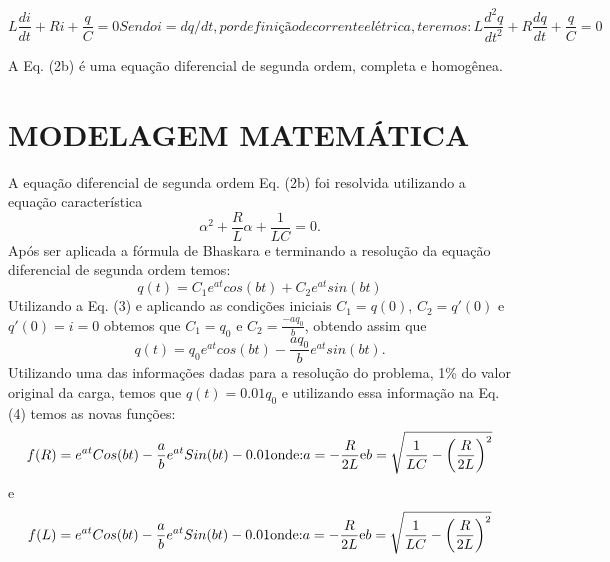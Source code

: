 \documentclass[12pt,fleqn]{article}
\begin{document}
\begin{subequations}
\label{eqn:total}
\begin{equation}
\label{eqn:parcial}
L\frac{di}{dt}+Ri+\frac{q}{C}=0
\end{equation}

Sendo i = dq/dt, por definição de corrente elétrica, teremos:

\begin{equation}
L\frac{d^{2}q}{dt^{2}} +R\frac{dq}{dt}+\frac{q}{C}=0
\label{eqn:parcia1}
\end{equation}
\end{subequations}

A Eq. (2b) é uma equação diferencial de segunda ordem, completa e homogênea. 

\section{MODELAGEM MATEMÁTICA}
A equação diferencial de segunda ordem \cite{boyce2017elementary} Eq. (2b) foi resolvida utilizando a equação característica
\begin{equation*}
\alpha ^{2}+\frac{R}{L}\alpha +\frac{1}{LC}=0  .
\label{eq}
\end{equation*}
Após ser aplicada a fórmula de Bhaskara e terminando a resolução da equação diferencial de segunda ordem temos:
\begin{equation}
q(t)=C_{1}e^{at}cos(bt)+C_{2}e^{at}sin(bt)
\label{eq}
\end{equation}
Utilizando a Eq. (3) e aplicando as condições iniciais $C_{1}={q}(0) $, $ C_{2}={q}'(0) $ e $ {q}'(0)=i=0 $
obtemos que $C_{1}=q_{0}$  e  $ C_{2}=\frac{-aq_{0}}{b}$, obtendo assim que
\begin{equation}
\label{eq}
q(t)=q_{0}e^{at}cos(bt)-\frac{aq_{0}}{b}e^{at}sin(bt).
\end{equation}
Utilizando uma das informações dadas para a resolução do problema, 1\% do valor original da carga, temos que $q(t)=0.01q_{0}$ e utilizando essa informação na Eq. (4) temos as novas funções:
\begin{equation}
f(R)=e^{at}Cos(bt)-\frac{a}{b}e^{at}Sin(bt)-0.01\\ \textrm{onde:} \\a=-\frac{R}{2L}\\ \textrm{e} \\b=\sqrt{\frac{1}{LC}-\left ( \frac{R}{2L} \right )^{2}}
\label{eq}
\end{equation}
e
\begin{equation}
f(L)=e^{at}Cos(bt)-\frac{a}{b}e^{at}Sin(bt)-0.01\\ \textrm{onde:} \\a=-\frac{R}{2L}\\ \textrm{e} \\b=\sqrt{\frac{1}{LC}-\left ( \frac{R}{2L} \right )^{2}}
\label{eq}
\end{equation}
\end{document}
